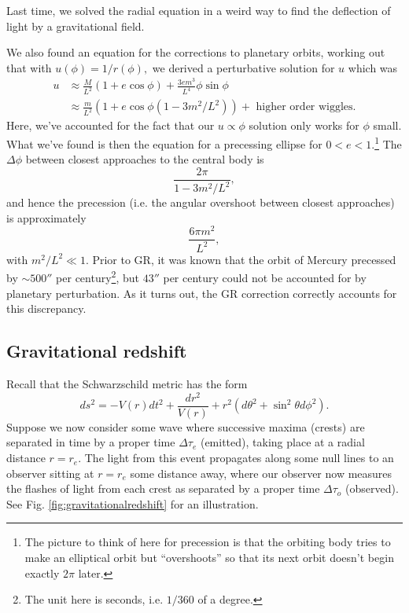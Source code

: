Last time, we solved the radial equation in a weird way to find the deflection of light by a gravitational field.

We also found an equation for the corrections to planetary orbits, working out that with $u(\phi)=1/r(\phi),$ we derived a perturbative solution for $u$ which was
\begin{align*}
u&\approx \frac{M}{L^2}(1+e\cos\phi)+\frac{3em^3}{L^4}\phi \sin\phi\\
&\approx \frac{m}{L^2}(1+e\cos\phi(1-3m^2/L^2))+\text{ higher order wiggles}.
\end{align*}
Here, we've accounted for the fact that our $u\propto \phi$ solution only works for $\phi$ small. What we've found is then the equation for a precessing ellipse for $0<e<1$.\footnote{The picture to think of here for precession is that the orbiting body tries to make an elliptical orbit but ``overshoots'' so that its next orbit doesn't begin exactly $2\pi$ later.} The $\Delta \phi$ between closest approaches to the central body is
$$\frac{2\pi}{1-3m^2/L^2},$$
and hence the precession (i.e. the angular overshoot between closest approaches) is approximately
$$\frac{6\pi m^2}{L^2},$$
with $m^2/L^2\ll1$. Prior to GR, it was known that the orbit of Mercury precessed by $\sim 500''$ per century\footnote{The unit here is seconds, i.e. $1/360$ of a degree.}, but $43''$ per century could not be accounted for by planetary perturbation. As it turns out, the GR correction correctly accounts for this discrepancy.

\subsection*{Gravitational redshift} Recall that the Schwarzschild metric has the form
$$ds^2=-V(r)dt^2+\frac{dr^2}{V(r)}+r^2(d\theta^2+\sin^2\theta d\phi^2).$$
Suppose we now consider some wave where successive maxima (crests) are separated in time by a proper time $\Delta \tau_e$ (emitted), taking place at a radial distance $r=r_e$. The light from this event propagates along some null lines to an observer sitting at $r=r_e$ some distance away, where our observer now measures the flashes of light from each crest as separated by a proper time $\Delta \tau_o$ (observed). See Fig. \ref{fig:gravitationalredshift} for an illustration.

